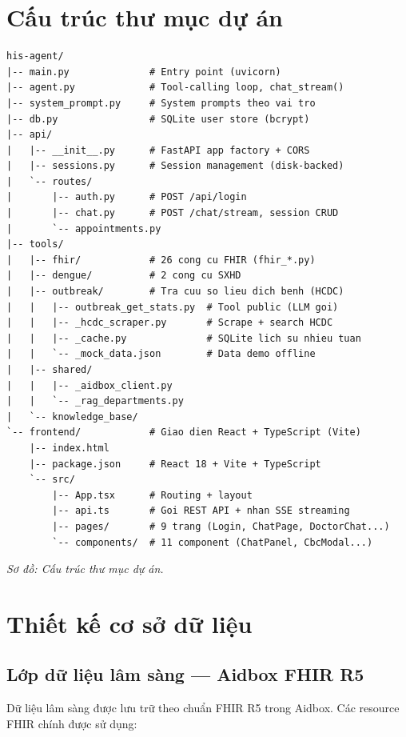 \documentclass[a4paper,13pt,3p,oneside]{report}
\theoremstyle{definition}
\theoremstyle{remark}
\theoremstyle{definition}
\begin{document}
\section{Cấu trúc thư mục dự án}

\begin{verbatim}
his-agent/
|-- main.py              # Entry point (uvicorn)
|-- agent.py             # Tool-calling loop, chat_stream()
|-- system_prompt.py     # System prompts theo vai tro
|-- db.py                # SQLite user store (bcrypt)
|-- api/
|   |-- __init__.py      # FastAPI app factory + CORS
|   |-- sessions.py      # Session management (disk-backed)
|   `-- routes/
|       |-- auth.py      # POST /api/login
|       |-- chat.py      # POST /chat/stream, session CRUD
|       `-- appointments.py
|-- tools/
|   |-- fhir/            # 26 cong cu FHIR (fhir_*.py)
|   |-- dengue/          # 2 cong cu SXHD
|   |-- outbreak/        # Tra cuu so lieu dich benh (HCDC)
|   |   |-- outbreak_get_stats.py  # Tool public (LLM goi)
|   |   |-- _hcdc_scraper.py       # Scrape + search HCDC
|   |   |-- _cache.py              # SQLite lich su nhieu tuan
|   |   `-- _mock_data.json        # Data demo offline
|   |-- shared/
|   |   |-- _aidbox_client.py
|   |   `-- _rag_departments.py
|   `-- knowledge_base/
`-- frontend/            # Giao dien React + TypeScript (Vite)
    |-- index.html
    |-- package.json     # React 18 + Vite + TypeScript
    `-- src/
        |-- App.tsx      # Routing + layout
        |-- api.ts       # Goi REST API + nhan SSE streaming
        |-- pages/       # 9 trang (Login, ChatPage, DoctorChat...)
        `-- components/  # 11 component (ChatPanel, CbcModal...)
\end{verbatim}
\textit{Sơ đồ: Cấu trúc thư mục dự án.}

\section{Thiết kế cơ sở dữ liệu}

\subsection{Lớp dữ liệu lâm sàng --- Aidbox FHIR R5}

Dữ liệu lâm sàng được lưu trữ theo chuẩn FHIR R5 trong Aidbox. Các resource FHIR chính được sử dụng:
\end{document}
